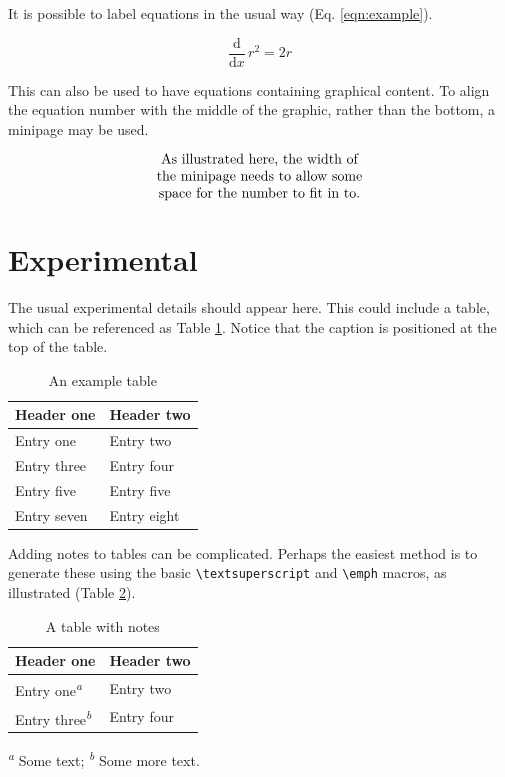 \documentclass[journal=jacsat,manuscript=article]{achemso}
\begin{document}
It is possible to label equations in the usual way (Eq.
\ref{eqn:example}).

\begin{equation}
  \frac{\mathrm{d}}{\mathrm{d}x} \, r^2 = 2r \label{eqn:example}
\end{equation}

This can also be used to have equations containing graphical content. To
align the equation number with the middle of the graphic, rather than
the bottom, a minipage may be used.

\begin{equation}
  \begin{minipage}[c]{0.80\linewidth}
    \centering
    As illustrated here, the width of \\
    the minipage needs to allow some  \\
    space for the number to fit in to.
  \end{minipage}
  \label{eqn:graphic}
\end{equation}

\section{Experimental}\label{experimental}

The usual experimental details should appear here. This could include a
table, which can be referenced as Table \ref{tbl:example}. Notice that
the caption is positioned at the top of the table.

\begin{table}
  \caption{An example table}
  \label{tbl:example}
  \begin{tabular}{ll}
    \hline
    Header one  & Header two  \\
    \hline
    Entry one   & Entry two   \\
    Entry three & Entry four  \\
    Entry five  & Entry five  \\
    Entry seven & Entry eight \\
    \hline
  \end{tabular}
\end{table}

Adding notes to tables can be complicated. Perhaps the easiest method is
to generate these using the basic
\texttt{\textbackslash textsuperscript} and \texttt{\textbackslash emph}
macros, as illustrated (Table \ref{tbl:notes}).

\begin{table}
  \caption{A table with notes}
  \label{tbl:notes}
  \begin{tabular}{ll}
    \hline
    Header one                            & Header two \\
    \hline
    Entry one\textsuperscript{\emph{a}}   & Entry two  \\
    Entry three\textsuperscript{\emph{b}} & Entry four \\
    \hline
  \end{tabular}

  \textsuperscript{\emph{a}} Some text;
  \textsuperscript{\emph{b}} Some more text.
\end{table}
\end{document}
